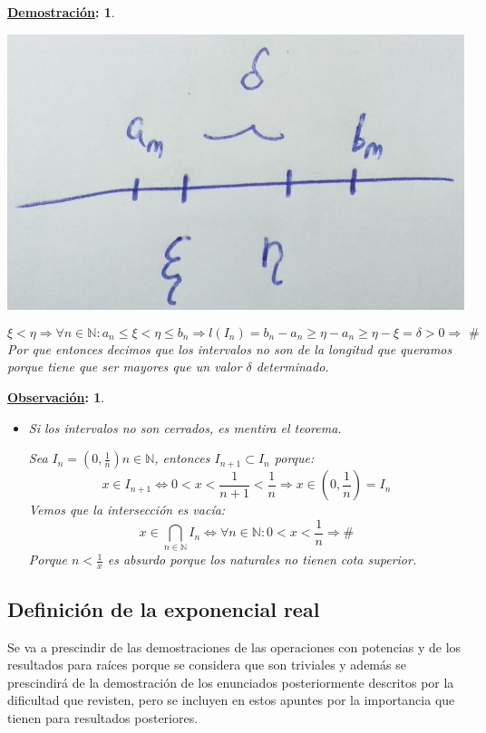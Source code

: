 \documentclass[10pt,a4paper,openright]{book}
\theoremstyle{break}
\newtheorem*{demo}{\underline{Demostración}:}
\newtheorem*{obs}{\underline{Observación}:}
\begin{document}
\begin{demo}
\begin{itemize}
\begin{center}
\includegraphics[scale=0.25]{corolario cantor 2}
\end{center}

$$\xi<\eta\Rightarrow \forall n \in \mathbb N: a_n\leq \xi<\eta\leq b_n\Rightarrow l(I_n)=b_n-a_n\geq \eta-a_n\geq \eta-\xi=\delta>0\Rightarrow \mbox{ \#}$$
Por que entonces decimos que los intervalos no son de la longitud que queramos porque tiene que ser mayores que un valor $\delta$ determinado.

\end{itemize}
\end{demo}

\begin{obs}
\begin{itemize}
\item Si los intervalos no son cerrados, es mentira el teorema.\par
Sea $I_n=\left(0,\frac{1}{n}\right) n\in \mathbb N$, entonces $I_{n+1}\subset I_n$ porque:
$$x\in I_{n+1}\Leftrightarrow 0<x<\frac{1}{n+1}<\frac{1}{n}\Rightarrow x\in \left(0,\frac{1}{n}\right)=I_n$$
Vemos que la intersección es vacía:
$$x\in \bigcap_{n\in \mathbb N}I_n\Leftrightarrow \forall n \in \mathbb N: 0<x<\frac{1}{n}\Rightarrow \#$$
Porque $n<\frac{1}{x}$ es absurdo porque los naturales no tienen cota superior.
\end{itemize}
\end{obs}

\subsection{Definición de la exponencial real}
Se va a prescindir de las demostraciones de las operaciones con potencias y de los resultados para raíces porque se considera que son triviales y además se prescindirá de la demostración de los enunciados posteriormente descritos por la dificultad que revisten, pero se incluyen en estos apuntes por la importancia que tienen para resultados posteriores.
\end{document}
